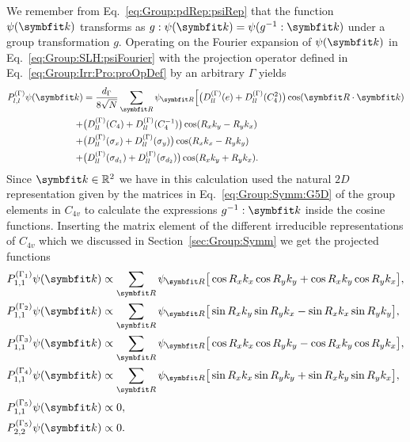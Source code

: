 We remember from Eq.~\eqref{eq:Group:pdRep:psiRep} that the function $\psi(\v{k})$ transforms as $g:\psi(\v{k}) = \psi(g^{-1}:\v{k})$ under a group
transformation $g$. Operating on the Fourier expansion of $\psi(\v{k})$ in Eq.~\eqref{eq:Group:SLH:psiFourier} with the projection operator
defined in Eq.~\eqref{eq:Group:Irr:Pro:proOpDef} by an arbitrary \irr $\Gamma$ yields
\begin{equation}
    \label{eq:Group:SLH:even:Ppsi}
    \begin{split}
        P_{l,l}^{(\Gamma)}\psi(\v{k}) &= \frac{d_\Gamma}{8\sqrt{N}}\sum_\v{R}\psi_\v{R}\Big[\big(D_{ll}^{(\Gamma)}(e)+D_{ll}^{(\Gamma)}(C_4^2)\big)\cos(\v{R}\cdot\v{k})\\
        + & \big(D_{ll}^{(\Gamma)}(C_4) + D_{ll}^{(\Gamma)}(C_4^{-1})\big)\cos(R_xk_y-R_yk_x)\\
        + & \big(D_{ll}^{(\Gamma)}(\sigma_x) + D_{ll}^{(\Gamma)}(\sigma_y)\big)\cos(R_xk_x-R_yk_y)\\
        + & \big(D_{ll}^{(\Gamma)}(\sigma_{d_1}) + D_{ll}^{(\Gamma)}(\sigma_{d_2})\big)\cos(R_xk_y+R_yk_x).
    \end{split}
\end{equation}
Since $\v{k}\in\mathbb{R}^2$ we have in this calculation used the natural $2D$ representation given by the matrices in Eq.~\eqref{eq:Group:Symm:G5D}
of the group elements in $C_{4v}$ to calculate the expressions $g^{-1}:\v{k}$ inside the cosine functions. Inserting the matrix element of the different
irreducible representations of $C_{4v}$ which we discussed in Section~\ref{sec:Group:Symm} we get the projected functions 
%
\begin{equation}
    \label{eq:Group:SLH:even:projections}
    \begin{split}
        P_{1,1}^{(\Gamma_1)}\psi(\v{k}) &\propto \sum_\v{R}\psi_\v{R}\big[\cos R_xk_x\cos R_yk_y + \cos R_xk_y\cos R_yk_x\big],\\
        P_{1,1}^{(\Gamma_2)}\psi(\v{k}) &\propto \sum_\v{R}\psi_\v{R}\big[\sin R_xk_y\sin R_yk_x - \sin R_xk_x\sin R_yk_y\big],\\
        P_{1,1}^{(\Gamma_3)}\psi(\v{k}) &\propto \sum_\v{R}\psi_\v{R}\big[\cos R_xk_x\cos R_yk_y - \cos R_xk_y\cos R_yk_x\big],\\
        P_{1,1}^{(\Gamma_4)}\psi(\v{k}) &\propto \sum_\v{R}\psi_\v{R}\big[\sin R_xk_x\sin R_yk_y + \sin R_xk_y\sin R_yk_x\big],\\
        P_{1,1}^{(\Gamma_5)}\psi(\v{k}) &\propto 0,\\
        P_{2,2}^{(\Gamma_5)}\psi(\v{k}) &\propto 0.
    \end{split}
\end{equation}
